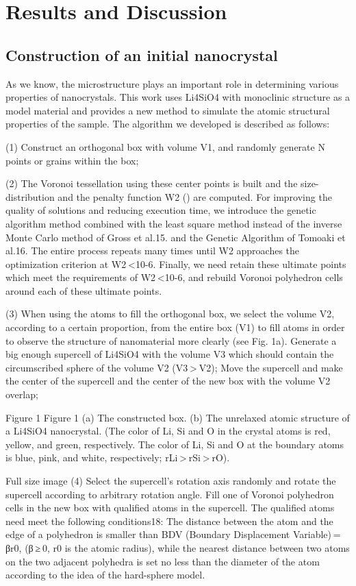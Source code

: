 \documentclass{article}
\begin{document}
\section{Results and Discussion}


\subsection{Construction of an initial nanocrystal}

As we know, the microstructure plays an important role in determining various properties of nanocrystals. This work uses Li4SiO4 with monoclinic structure as a model material and provides a new method to simulate the atomic structural properties of the sample. The algorithm we developed is described as follows:

(1) Construct an orthogonal box with volume V1, and randomly generate N points or grains within the box;

(2) The Voronoi tessellation using these center points is built and the size-distribution  and the penalty function W2 () are computed. For improving the quality of solutions and reducing execution time, we introduce the genetic algorithm method combined with the least square method instead of the inverse Monte Carlo method of Gross et al.15. and the Genetic Algorithm of Tomoaki et al.16. The entire process repeats many times until W2 approaches the optimization criterion at W2 <10-6. Finally, we need retain these ultimate points which meet the requirements of W2 <10-6, and rebuild Voronoi polyhedron cells around each of these ultimate points.

(3) When using the atoms to fill the orthogonal box, we select the volume V2, according to a certain proportion, from the entire box (V1) to fill atoms in order to observe the structure of nanomaterial more clearly (see Fig. 1a). Generate a big enough supercell of Li4SiO4 with the volume V3 which should contain the circumscribed sphere of the volume V2 (V3 > V2); Move the supercell and make the center of the supercell and the center of the new box with the volume V2 overlap;

Figure 1
Figure 1
(a) The constructed box. (b) The unrelaxed atomic structure of a Li4SiO4 nanocrystal. (The color of Li, Si and O in the crystal atoms is red, yellow, and green, respectively. The color of Li, Si and O at the boundary atoms is blue, pink, and white, respectively; rLi > rSi > rO).

Full size image
(4) Select the supercell’s rotation axis randomly and rotate the supercell according to arbitrary rotation angle. Fill one of Voronoi polyhedron cells in the new box with qualified atoms in the supercell. The qualified atoms need meet the following conditions18: The distance between the atom and the edge of a polyhedron is smaller than BDV (Boundary Displacement Variable) = βr0, (β ≥ 0, r0 is the atomic radius), while the nearest distance between two atoms on the two adjacent polyhedra is set no less than the diameter of the atom according to the idea of the hard-sphere model.
\end{document}

